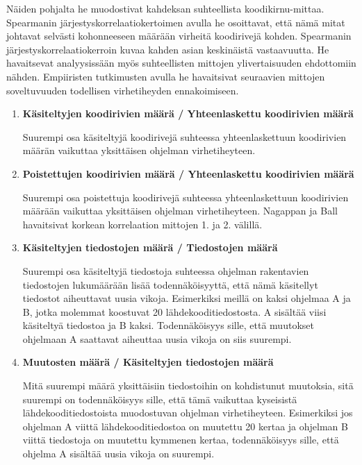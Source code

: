 \documentclass[finnish]{../tktltiki2}
\theoremstyle{definition}
\theoremstyle{remark}
\begin{document}
Näiden pohjalta he muodostivat kahdeksan suhteellista koodikirnu-mittaa. Spearmanin järjestyskorrelaatiokertoimen avulla he osoittavat, että nämä mitat johtavat selvästi kohonneeseen määrään virheitä koodirivejä kohden. Spearmanin järjestyskorrelaatiokerroin kuvaa kahden asian keskinäistä vastaavuutta. He havaitsevat analyysissään myös suhteellisten mittojen ylivertaisuuden ehdottomiin nähden. Empiiristen tutkimusten avulla he havaitsivat seuraavien mittojen soveltuvuuden todellisen virhetiheyden ennakoimiseen.

\begin{enumerate}
    
    \item {\bf Käsiteltyjen koodirivien määrä / Yhteenlaskettu koodirivien määrä}
    
    Suurempi osa käsiteltyjä koodirivejä suhteessa yhteenlaskettuun koodirivien määrän vaikuttaa yksittäisen ohjelman virhetiheyteen.
    
    \item {\bf Poistettujen koodirivien määrä / Yhteenlaskettu koodirivien määrä}
    
    Suurempi osa poistettuja koodirivejä suhteessa yhteenlaskettuun koodirivien määrään vaikuttaa yksittäisen ohjelman virhetiheyteen. Nagappan ja Ball havaitsivat korkean korrelaation mittojen 1. ja 2. välillä.
    
    \item {\bf Käsiteltyjen tiedostojen määrä / Tiedostojen määrä}
    
    Suurempi osa käsiteltyjä tiedostoja suhteessa ohjelman rakentavien tiedostojen lukumäärään lisää todennäköisyyttä, että nämä käsitellyt tiedostot aiheuttavat uusia vikoja. Esimerkiksi meillä on kaksi ohjelmaa A ja B, jotka molemmat koostuvat 20 lähdekooditiedostosta. A sisältää viisi käsiteltyä tiedostoa ja B kaksi. Todennäköisyys sille, että muutokset ohjelmaan A saattavat aiheuttaa uusia vikoja on siis suurempi.
    
    \item {\bf Muutosten määrä / Käsiteltyjen tiedostojen määrä}
    
    Mitä suurempi määrä yksittäisiin tiedostoihin on kohdistunut muutoksia, sitä suurempi on todennäköisyys sille, että tämä vaikuttaa kyseisistä lähdekooditiedostoista muodostuvan ohjelman virhetiheyteen. Esimerkiksi jos ohjelman A viittä lähdekooditiedostoa on muutettu 20 kertaa ja ohjelman B viittä tiedostoja on muutettu kymmenen kertaa, todennäköisyys sille, että ohjelma A sisältää uusia vikoja on suurempi.


\end{enumerate}
\end{document}
